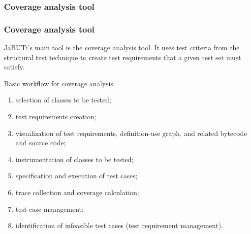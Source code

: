 \begin{frame}[c,parent={cmap:jabuti-software-testing},hasnext=true,hasprev=false]
\label{cmap:coverage-analysis-tool}
\frametitle{Coverage analysis tool}

\end{frame}


\begin{frame}[parent={cmap:coverage-analysis-tool},hasnext=true,hasprev=true]
\frametitle{Coverage analysis tool}
\label{concept:coverage-analysis-tool}
\label{concept:software-testing-tool}

\begin{block:concept}{}
JaBUTi's main tool is the coverage analysis tool. It uses test
criteria from the structural test technique to create test requirements
that a given test set must satisfy.
\end{block:concept}

\begin{block:procedure}{Basic workflow for coverage analysis}
\begin{enumerate}
	\item selection of classes to be tested;

	\item test requirements creation;

	\item visualization of test requirements, definition-use graph, and
	related bytecode and source code;

	\item instrumentation of classes to be tested;

	\item specification and execution of test cases;

	\item trace collection and coverage calculation;

	\item test case management;

	\item identification of infeasible test cases (test requirement
	management).
\end{enumerate}
\end{block:procedure}

\hfill
{}
\end{frame}

